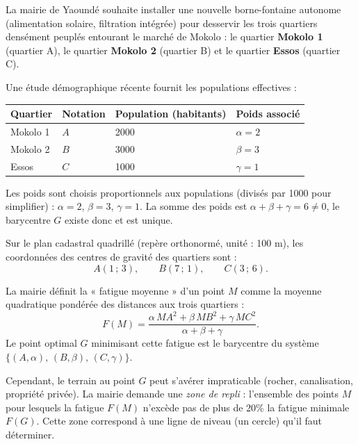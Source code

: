 \documentclass[11pt]{article}
\newcounter{popsec}
\newcounter{popsub}
\newcommand{\courssub}[1]{%
  \stepcounter{popsub}%
  \par\vspace{9pt}\noindent{\popxbold\fontsize{11.5}{13}\selectfont\color{popink}{\color{poporange}\thepopsec.\thepopsub}\hspace{6pt}#1}\par\nopagebreak\vspace{4pt}
}
\begin{document}
\courssub{Situation}
La mairie de Yaoundé souhaite installer une nouvelle borne-fontaine autonome (alimentation solaire, filtration intégrée) pour desservir les trois quartiers densément peuplés entourant le marché de Mokolo : le quartier \textbf{Mokolo 1} (quartier A), le quartier \textbf{Mokolo 2} (quartier B) et le quartier \textbf{Essos} (quartier C).

Une étude démographique récente fournit les populations effectives :
\begin{center}
\begin{tabularx}{\linewidth}{|l|X|X|X|}\hline
\textbf{Quartier} & \textbf{Notation} & \textbf{Population (habitants)} & \textbf{Poids associé} \\ \hline
Mokolo 1 & $A$ & 2000 & $\alpha = 2$ \\
Mokolo 2 & $B$ & 3000 & $\beta = 3$ \\
Essos & $C$ & 1000 & $\gamma = 1$ \\ \hline
\end{tabularx}
\end{center}
Les poids sont choisis proportionnels aux populations (divisés par 1000 pour simplifier) : $\alpha=2$, $\beta=3$, $\gamma=1$. La somme des poids est $\alpha+\beta+\gamma = 6 \neq 0$, le barycentre $G$ existe donc et est unique.

Sur le plan cadastral quadrillé (repère orthonormé, unité : 100 m), les coordonnées des centres de gravité des quartiers sont :
\[
A(1\,;\,3),\qquad B(7\,;\,1),\qquad C(3\,;\,6).
\]

La mairie définit la « fatigue moyenne » d'un point $M$ comme la moyenne quadratique pondérée des distances aux trois quartiers :
\[
F(M) = \frac{\alpha\,MA^2 + \beta\,MB^2 + \gamma\,MC^2}{\alpha+\beta+\gamma}.
\]
Le point optimal $G$ minimisant cette fatigue est le barycentre du système $\{(A,\alpha),\,(B,\beta),\,(C,\gamma)\}$.

Cependant, le terrain au point $G$ peut s'avérer impraticable (rocher, canalisation, propriété privée). La mairie demande une \emph{zone de repli} : l'ensemble des points $M$ pour lesquels la fatigue $F(M)$ n'excède pas de plus de 20\% la fatigue minimale $F(G)$. Cette zone correspond à une ligne de niveau (un cercle) qu'il faut déterminer.
\end{document}
